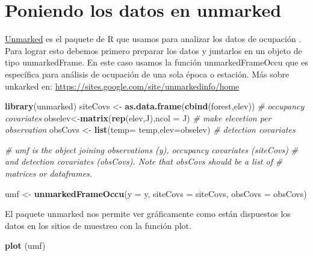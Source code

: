 \documentclass[
]{book}
\newenvironment{Shaded}{\begin{snugshade}}{\end{snugshade}}
\newcommand{\CommentTok}[1]{\textcolor[rgb]{0.56,0.35,0.01}{\textit{#1}}}
\newcommand{\DataTypeTok}[1]{\textcolor[rgb]{0.13,0.29,0.53}{#1}}
\newcommand{\KeywordTok}[1]{\textcolor[rgb]{0.13,0.29,0.53}{\textbf{#1}}}
\newcommand{\NormalTok}[1]{#1}
\newcommand{\StringTok}[1]{\textcolor[rgb]{0.31,0.60,0.02}{#1}}
\begin{document}
\hypertarget{poniendo-los-datos-en-unmarked}{%
\section{Poniendo los datos en unmarked}\label{poniendo-los-datos-en-unmarked}}

\href{http://cran.r-project.org/web/packages/unmarked/index.html}{Unmarked} es el paquete de R que usamos para analizar los datos de ocupación \citep{Fiske2011}. Para lograr esto debemos primero preparar los datos y juntarlos en un objeto de tipo unmarkedFrame. En este caso usamos la función unmarkedFrameOccu que es específica para análisis de ocupación de una sola época o estación. Más sobre unkarked en: \url{https://sites.google.com/site/unmarkedinfo/home}

\begin{Shaded}
\begin{Highlighting}[]
\KeywordTok{library}\NormalTok{(unmarked)}
\NormalTok{siteCovs <-}\StringTok{ }\KeywordTok{as.data.frame}\NormalTok{(}\KeywordTok{cbind}\NormalTok{(forest,elev)) }\CommentTok{# occupancy covariates }
\NormalTok{obselev<-}\KeywordTok{matrix}\NormalTok{(}\KeywordTok{rep}\NormalTok{(elev,J),}\DataTypeTok{ncol =}\NormalTok{ J) }\CommentTok{# make elevetion per observation}
\NormalTok{obsCovs <-}\StringTok{ }\KeywordTok{list}\NormalTok{(}\DataTypeTok{temp=}\NormalTok{ temp,}\DataTypeTok{elev=}\NormalTok{obselev) }\CommentTok{# detection covariates}

\CommentTok{# umf is the object joining observations (y), occupancy covariates (siteCovs)}
\CommentTok{# and detection covariates (obsCovs). Note that obsCovs should be a list of }
\CommentTok{# matrices or dataframes.}

\NormalTok{umf <-}\StringTok{ }\KeywordTok{unmarkedFrameOccu}\NormalTok{(}\DataTypeTok{y =}\NormalTok{ y, }\DataTypeTok{siteCovs =}\NormalTok{ siteCovs, }\DataTypeTok{obsCovs =}\NormalTok{ obsCovs)}
\end{Highlighting}
\end{Shaded}

El paquete unmarked nos permite ver gráficamente como están dispuestos los datos en los sitios de muestreo con la función plot.

\begin{Shaded}
\begin{Highlighting}[]
\KeywordTok{plot}\NormalTok{ (umf)}
\end{Highlighting}
\end{Shaded}
\end{document}
